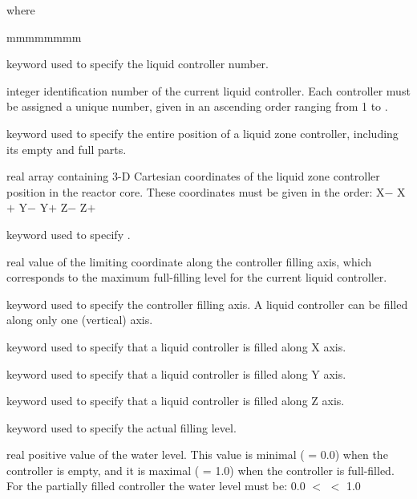 \noindent where
\begin{ListeDeDescription}{mmmmmmmm}

\item[\moc{LZC}] keyword used to specify the liquid controller
 number.

\item[\dusa{id}] integer identification number of the current liquid controller.
Each controller must be assigned a unique  number, given in an
ascending order ranging from 1 to .

\item[\moc{MAXPOS}] keyword used to specify the entire position of a
liquid zone controller, including its empty and full parts.

\item[\dusa{pos}] real array containing 3-D Cartesian coordinates of the
liquid zone controller position in the reactor core. These coordinates
must be given in the order: X$-$  X$+$   Y$-$  Y$+$   Z$-$  Z$+$

\item[\moc{MAX-FULL}] keyword used to specify .

\item[\dusa{fmax}] real value of the limiting coordinate along the controller
filling axis, which corresponds to the maximum full-filling level for the current
liquid controller.

\item[\moc{AXIS}] keyword used to specify the controller filling axis.
A liquid controller can be filled along only one (vertical) axis.

\item[\moc{X}] keyword used to specify that a liquid controller is filled along X axis.

\item[\moc{Y}] keyword used to specify that a liquid controller is filled along Y axis.

\item[\moc{Z}] keyword used to specify that a liquid controller is filled along Z axis.

\item[\moc{LEVEL}] keyword used to specify the actual filling level.

\item[\dusa{value}] real positive value of the water level. This value is minimal
( = 0.0) when the controller is empty, and it is maximal ( = 1.0)
when the controller is full-filled. For the partially filled controller the water level
must be: 0.0 $<$  $<$ 1.0


\end{ListeDeDescription}
